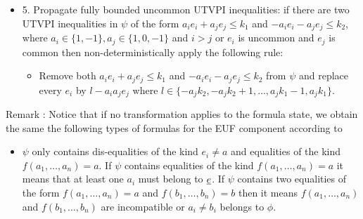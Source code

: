 \begin{itemize}



  \item[] 5.  Propagate fully bounded uncommon UTVPI inequalities: 
    if there are two UTVPI inequalities 
    in $\psi$ of the form $a_i e_i + a_j e_j \leq k_1$ and 
    $-a_i e_i - a_j e_j \leq k_2$, 
    where $a_i \in \{1, -1\}, a_j \in \{1, 0, -1\}$ and $i > j$ or $e_i$ is uncommon
    and $e_j$ is common
    then  non-deterministically apply the following rule:
    \begin{itemize}
      \item Remove both $a_i e_i + a_j e_j \leq k_1$ and $-a_i e_i - a_j e_j \leq k_2$
        from $\psi$ and replace every $e_i$ by $l - a_i a_j e_j$ where $
        l \in \{- a_j k_2, -a_j k_2 + 1, \dots, a_j k_1 - 1, a_j k_1\}$.
    \end{itemize}

  \end{itemize} 

Remark \label{my_remark}: Notice that if no 
transformation applies 
to the formula state, we obtain the same 
the following types of formulas for the EUF 
component according to \cite{ghilardi2020compactly} 

\begin{itemize}
  \item $\psi$ only contains dis-equalities of the kind $e_i \neq a$ and equalities of
    the kind $f(a_1, \dots, a_n) = a$. If $\psi$ contains equalities of the
    kind $f(a_1, \dots, a_n) = a$ it means that at least one $a_i$ must belong
    to $\underline{e}$. If $\psi$ contains two equalities of the form
    $f(a_1, \dots, a_n) = a$ and $f(b_1, \dots, b_n) = b$ then it means
    $f(a_1, \dots, a_n)$ and $f(b_1, \dots, b_n)$ are incompatible or $a_i \neq b_i$
    belongs to $\phi$.
\end{itemize}

